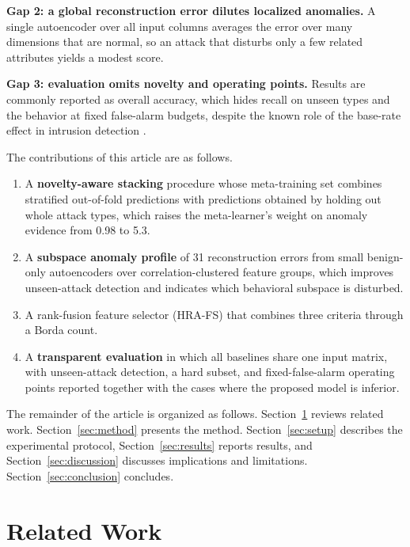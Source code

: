 \documentclass[journal]{IEEEtran}
\begin{document}
\textbf{Gap 2: a global reconstruction error dilutes localized anomalies.} A single autoencoder over all input columns averages the error over many dimensions that are normal, so an attack that disturbs only a few related attributes yields a modest score.

\textbf{Gap 3: evaluation omits novelty and operating points.} Results are commonly reported as overall accuracy, which hides recall on unseen types and the behavior at fixed false-alarm budgets, despite the known role of the base-rate effect in intrusion detection \cite{axelsson2000}.

The contributions of this article are as follows.
\begin{enumerate}
\item A \textbf{novelty-aware stacking} procedure whose meta-training set combines stratified out-of-fold predictions with predictions obtained by holding out whole attack types, which raises the meta-learner's weight on anomaly evidence from 0.98 to 5.3.
\item A \textbf{subspace anomaly profile} of 31 reconstruction errors from small benign-only autoencoders over correlation-clustered feature groups, which improves unseen-attack detection and indicates which behavioral subspace is disturbed.
\item A rank-fusion feature selector (HRA-FS) that combines three criteria through a Borda count.
\item A \textbf{transparent evaluation} in which all baselines share one input matrix, with unseen-attack detection, a hard subset, and fixed-false-alarm operating points reported together with the cases where the proposed model is inferior.
\end{enumerate}

The remainder of the article is organized as follows. Section~\ref{sec:related} reviews related work. Section~\ref{sec:method} presents the method. Section~\ref{sec:setup} describes the experimental protocol, Section~\ref{sec:results} reports results, and Section~\ref{sec:discussion} discusses implications and limitations. Section~\ref{sec:conclusion} concludes.

\section{Related Work}
\label{sec:related}
\end{document}
